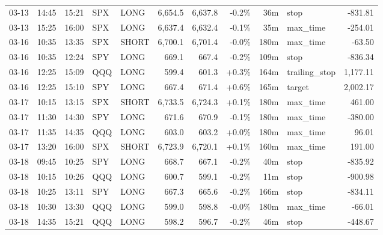 \documentclass[11pt,a4paper,twoside]{article}
\begin{document}
\begin{center}
\begin{longtable}{>{\color{txtmain}}l l l l l r r r r >{\color{txtmain}}l r}
03-13 & 14:45 & 15:21 & SPX & LONG & 6,654.5 & 6,637.8 & \textcolor{lossred}{-0.2\%} & 36m & stop & \textcolor{lossred}{-831.81} \\
03-13 & 15:25 & 16:00 & SPX & LONG & 6,637.4 & 6,632.4 & \textcolor{lossred}{-0.1\%} & 35m & max\_time & \textcolor{lossred}{-254.01} \\
03-16 & 10:35 & 13:35 & SPX & SHORT & 6,700.1 & 6,701.4 & \textcolor{lossred}{-0.0\%} & 180m & max\_time & \textcolor{lossred}{-63.50} \\
03-16 & 10:35 & 12:24 & SPY & LONG & 669.1 & 667.4 & \textcolor{lossred}{-0.2\%} & 109m & stop & \textcolor{lossred}{-836.34} \\
03-16 & 12:25 & 15:09 & QQQ & LONG & 599.4 & 601.3 & \textcolor{wingreen}{+0.3\%} & 164m & trailing\_stop & \textcolor{wingreen}{1,177.11} \\
03-16 & 12:25 & 15:10 & SPY & LONG & 667.4 & 671.4 & \textcolor{wingreen}{+0.6\%} & 165m & target & \textcolor{wingreen}{2,002.17} \\
03-17 & 10:15 & 13:15 & SPX & SHORT & 6,733.5 & 6,724.3 & \textcolor{wingreen}{+0.1\%} & 180m & max\_time & \textcolor{wingreen}{461.00} \\
03-17 & 11:30 & 14:30 & SPY & LONG & 671.6 & 670.9 & \textcolor{lossred}{-0.1\%} & 180m & max\_time & \textcolor{lossred}{-380.00} \\
03-17 & 11:35 & 14:35 & QQQ & LONG & 603.0 & 603.2 & \textcolor{wingreen}{+0.0\%} & 180m & max\_time & \textcolor{wingreen}{96.01} \\
03-17 & 13:20 & 16:00 & SPX & SHORT & 6,723.9 & 6,720.1 & \textcolor{wingreen}{+0.1\%} & 160m & max\_time & \textcolor{wingreen}{191.00} \\
03-18 & 09:45 & 10:25 & SPY & LONG & 668.7 & 667.1 & \textcolor{lossred}{-0.2\%} & 40m & stop & \textcolor{lossred}{-835.92} \\
03-18 & 10:15 & 10:26 & QQQ & LONG & 600.7 & 599.1 & \textcolor{lossred}{-0.2\%} & 11m & stop & \textcolor{lossred}{-900.98} \\
03-18 & 10:25 & 13:11 & SPY & LONG & 667.3 & 665.6 & \textcolor{lossred}{-0.2\%} & 166m & stop & \textcolor{lossred}{-834.11} \\
03-18 & 10:30 & 13:30 & QQQ & LONG & 599.0 & 598.8 & \textcolor{lossred}{-0.0\%} & 180m & max\_time & \textcolor{lossred}{-66.01} \\
03-18 & 14:35 & 15:21 & QQQ & LONG & 598.2 & 596.7 & \textcolor{lossred}{-0.2\%} & 46m & stop & \textcolor{lossred}{-448.67} \\

\end{longtable}
\end{center}
\end{document}
